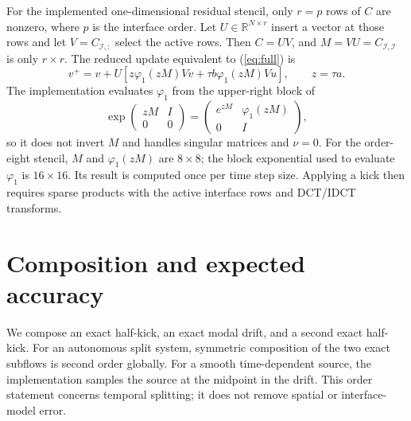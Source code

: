 \documentclass[10pt]{article}
\begin{document}
For the implemented one-dimensional residual stencil, only $r=p$ rows of
$C$ are nonzero, where $p$ is the interface order. Let $U\in\mathbb R^{N\times r}$
insert a vector at those rows and let $V=C_{\mathcal I,:}$ select the active
rows. Then $C=UV$, and $M=VU=C_{\mathcal I,\mathcal I}$ is only $r\times r$.
The reduced update equivalent to (\ref{eq:full}) is
\begin{equation}\label{eq:reduced}
 v^+=v+U\left[z\varphi_1(zM)Vv+
      \tau b\varphi_1(zM)Vu\right],\qquad z=\tau a.
\end{equation}
The implementation evaluates $\varphi_1$ from the upper-right block of
\begin{equation}
 \exp\!\begin{pmatrix}zM&I\\0&0\end{pmatrix}
 =\begin{pmatrix}e^{zM}&\varphi_1(zM)\\0&I\end{pmatrix},
\end{equation}
so it does not invert $M$ and handles singular matrices and $\nu=0$.
For the order-eight stencil, $M$ and $\varphi_1(zM)$ are $8\times8$;
the block exponential used to evaluate $\varphi_1$ is $16\times16$.
Its result is computed once per time step size. Applying a kick
then requires sparse products with the active interface rows and DCT/IDCT
transforms.

\section{Composition and expected accuracy}
We compose an exact half-kick, an exact modal drift, and a second exact
half-kick. For an autonomous split system, symmetric composition of the two
exact subflows is second order globally. For a smooth time-dependent source,
the implementation samples the source at the midpoint in the drift. This
order statement concerns temporal splitting; it does not remove spatial or
interface-model error.
\end{document}
